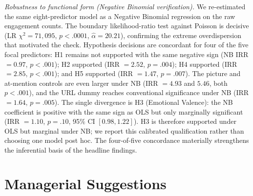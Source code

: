 \documentclass[12pt,a4paper]{article}
\begin{document}
\textit{Robustness to functional form (Negative Binomial verification).} We re-estimated the same eight-predictor model as a Negative Binomial regression on the raw engagement counts. The boundary likelihood-ratio test against Poisson is decisive (LR $\chi^2 = 71{,}095$, $p<.0001$, $\hat\alpha=20.21$), confirming the extreme overdispersion that motivated the check. Hypothesis decisions are concordant for four of the five focal predictors: H1 remains not supported with the same negative sign (NB IRR $=0.97$, $p<.001$); H2 supported (IRR $=2.52$, $p=.004$); H4 supported (IRR $=2.85$, $p<.001$); and H5 supported (IRR $=1.47$, $p=.007$). The picture and at-mention controls are even larger under NB (IRR $=4.93$ and $5.46$, both $p<.001$), and the URL dummy reaches conventional significance under NB (IRR $=1.64$, $p=.005$). The single divergence is H3 (Emotional Valence): the NB coefficient is positive with the same sign as OLS but only marginally significant (IRR $=1.10$, $p=.10$, 95\% CI $[0.98, 1.22]$). H3 is therefore supported under OLS but marginal under NB; we report this calibrated qualification rather than choosing one model post hoc. The four-of-five concordance materially strengthens the inferential basis of the headline findings.

\section{Managerial Suggestions}
\end{document}
